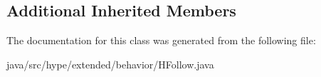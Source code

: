 \subsection*{Additional Inherited Members}


The documentation for this class was generated from the following file\-:\begin{DoxyCompactItemize}
\item 
java/src/hype/extended/behavior/H\-Follow.\-java\end{DoxyCompactItemize}
